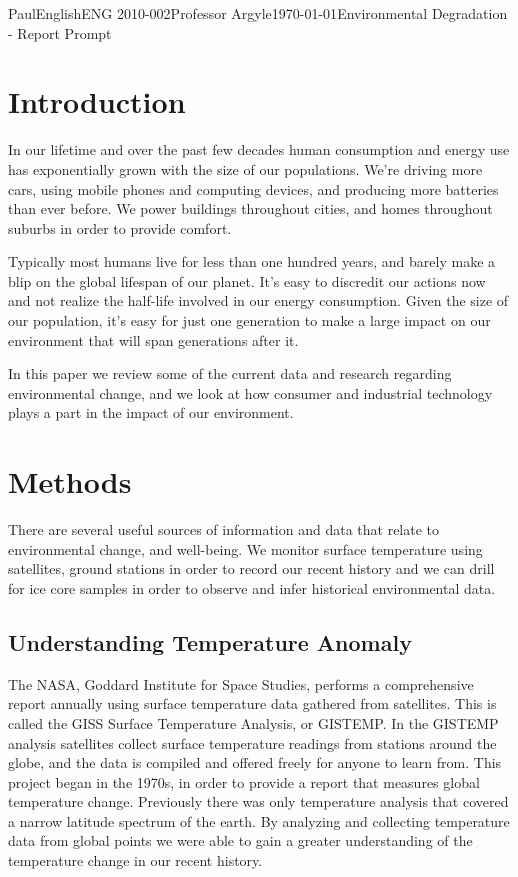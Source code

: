 \documentclass[12pt,letterpaper]{article}
\begin{document}
\begin{mla}{Paul}{English}{ENG 2010-002}{Professor Argyle}{\today}{Environmental Degradation - Report Prompt}
\section{Introduction}
In our lifetime and over the past few decades human consumption and energy use has exponentially grown with the size of our populations. We're driving more cars, using mobile phones and computing devices, and producing more batteries than ever before. We power buildings throughout cities, and homes throughout suburbs in order to provide comfort. 

Typically most humans live for less than one hundred years, and barely make a blip on the global lifespan of our planet. It's easy to discredit our actions now and not realize the half-life involved in our energy consumption. Given the size of our population, it's easy for just one generation to make a large impact on our environment that will span generations after it.

In this paper we review some of the current data and research regarding environmental change, and we look at how consumer and industrial technology plays a part in the impact of our environment. 

\section{Methods}
There are several useful sources of information and data that relate to environmental change, and well-being. We monitor surface temperature using satellites, ground stations in order to record our recent history and we can drill for ice core samples in order to observe and infer historical environmental data.

\subsection{Understanding Temperature Anomaly}
The NASA, Goddard Institute for Space Studies, performs a comprehensive report annually using surface temperature data gathered from satellites. This is called the GISS Surface Temperature Analysis, or GISTEMP. In the GISTEMP analysis satellites collect surface temperature readings from stations around the globe, and the data is compiled and offered freely for anyone to learn from. This project began in the 1970s, in order to provide a report that measures global temperature change. Previously there was only temperature analysis that covered a narrow latitude spectrum of the earth. By analyzing and collecting temperature data from global points we were able to gain a greater understanding of the temperature change in our recent history.


\end{mla}
\end{document}

